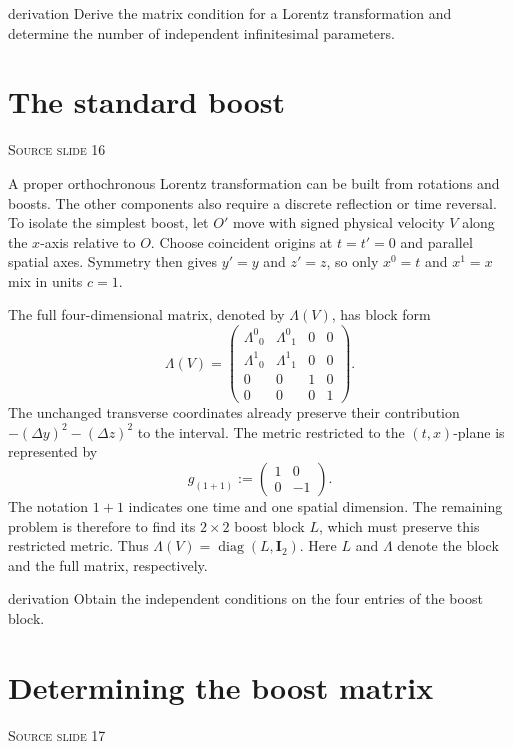 \documentclass[11pt,a4paper]{article}
\newcommand{\id}{\mathbf{I}}
\newcommand{\slideref}[1]{%
  \par\smallskip
  {\footnotesize\color{ink!60}\textsc{Source slide #1}}\par
}
\begin{document}
\begin{studentwork}[height=6.0cm]{derivation}
Derive the matrix condition for a Lorentz transformation and determine the
number of independent infinitesimal parameters.
\end{studentwork}

\section{The standard boost}
\slideref{16}

A proper orthochronous Lorentz transformation can be built from rotations and
boosts. The other components also require a discrete reflection or time
reversal. To isolate the simplest boost, let \(O'\) move with signed physical
velocity \(V\) along the \(x\)-axis relative to \(O\). Choose coincident origins at
\(t=t'=0\) and parallel spatial axes. Symmetry then gives \(y'=y\) and
\(z'=z\), so only \(x^0=t\) and \(x^1=x\) mix in units \(c=1\).

The full four-dimensional matrix, denoted by \(\Lambda(V)\), has block form
\[
\Lambda(V)=
\begin{pmatrix}
  \Lambda^0{}_0 & \Lambda^0{}_1 & 0 & 0\\
  \Lambda^1{}_0 & \Lambda^1{}_1 & 0 & 0\\
  0&0&1&0\\
  0&0&0&1
\end{pmatrix}.
\]
The unchanged transverse coordinates already preserve their contribution
\(- (\Delta y)^2- (\Delta z)^2\) to the interval. The metric restricted to the
\((t,x)\)-plane is represented by
\[
  g_{(1+1)}
  :=
  \begin{pmatrix}
    1&0\\
    0&-1
  \end{pmatrix}.
\]
The notation \(1+1\) indicates one time and one spatial dimension. The
remaining problem is therefore to find its \(2\times2\) boost block \(L\),
which must preserve this restricted metric. Thus \(\Lambda(V)=\operatorname{diag}(L,\id_2)\). Here \(L\) and \(\Lambda\) denote the block and the full matrix, respectively.

\begin{studentwork}[height=6.8cm]{derivation}
Obtain the independent conditions on the four entries of the boost block.
\end{studentwork}

\section{Determining the boost matrix}
\slideref{17}
\end{document}
